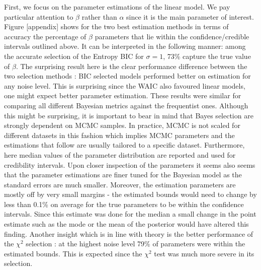 \documentclass[]{article}
\begin{document}
First, we focus on the parameter estimations of the linear model. We pay
particular attention to \(\beta\) rather than \(\alpha\) since it is the
main parameter of interest. Figure {[}appendix{]} shows for the two best
estimation methods in terms of accuracy the percentage of \(\beta\)
parameters that lie within the confidence/credible intervals outlined
above. It can be interpreted in the following manner: among the accurate
selection of the Entropy BIC for \(\sigma = 1\), 73\% capture the true
value of \(\beta\). The surprising result here is the clear performance
difference between the two selection methods : BIC selected models
performed better on estimation for any noise level. This is surprising
since the WAIC also favoured linear models, one might expect better
parameter estimation. These results were similar for comparing all
different Bayesian metrics against the frequentist ones. Although this
might be surprising, it is important to bear in mind that Bayes
selection are strongly dependent on MCMC samples. In practice, MCMC is
not scaled for different datasets in this fashion which implies MCMC
parameters and the estimations that follow are usually tailored to a
specific dataset. Furthermore, here median values of the parameter
distribution are reported and used for credibility intervals. Upon
closer inspection of the parameters it seems also seems that the
parameter estimations are finer tuned for the Bayesian model as the
standard errors are much smaller. Moreover, the estimation parameters
are mostly off by very small margins - the estimated bounds would need
to change by less than 0.1\% on average for the true parameters to be
within the confidence intervals. Since this estimate was done for the
median a small change in the point estimate such as the mode or the mean
of the posterior would have altered this finding. Another insight which
is in line with theory is the better performance of the \(\chi^2\)
selection : at the highest noise level 79\% of parameters were within
the estimated bounds. This is expected since the \(\chi^2\) test was
much more severe in its selection.
\end{document}
